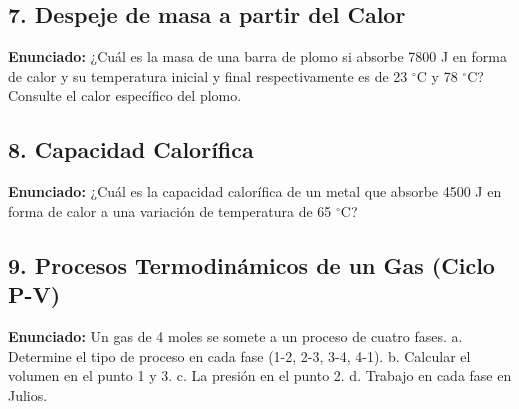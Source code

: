 \documentclass[12pt, letterpaper]{article}
\begin{document}
	\subsection*{7. Despeje de masa a partir del Calor}
	\noindent \textbf{Enunciado:} ¿Cuál es la masa de una barra de plomo si absorbe 7800 J en forma de calor y su temperatura inicial y final respectivamente es de 23 $^{\circ}$C y 78 $^{\circ}$C? Consulte el calor específico del plomo.
	
	
	\subsection*{8. Capacidad Calorífica}
	\noindent \textbf{Enunciado:} ¿Cuál es la capacidad calorífica de un metal que absorbe 4500 J en forma de calor a una variación de temperatura de 65 $^{\circ}$C?
	
	
\subsection*{9. Procesos Termodinámicos de un Gas (Ciclo P-V)}
\noindent \textbf{Enunciado:} Un gas de 4 moles se somete a un proceso de cuatro fases. a. Determine el tipo de proceso en cada fase (1-2, 2-3, 3-4, 4-1). b. Calcular el volumen en el punto 1 y 3. c. La presión en el punto 2. d. Trabajo en cada fase en Julios.
\end{document}
